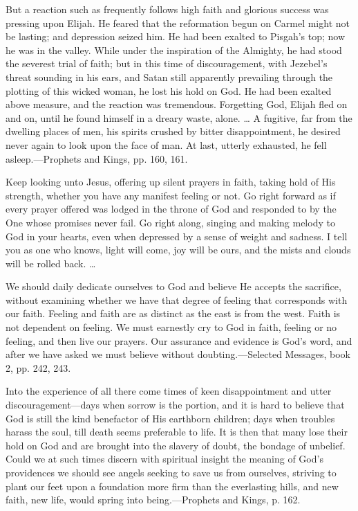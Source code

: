 \documentclass[a4paper, 10pt, twoside, headings=small]{scrartcl}
\begin{document}
\begin{multicols}{2}
But a reaction such as frequently follows high faith and glorious success was pressing upon Elijah. He feared that the reformation begun on Carmel might not be lasting; and depression seized him. He had been exalted to Pisgah’s top; now he was in the valley. While under the inspiration of the Almighty, he had stood the severest trial of faith; but in this time of discouragement, with Jezebel’s threat sounding in his ears, and Satan still apparently prevailing through the plotting of this wicked woman, he lost his hold on God. He had been exalted above measure, and the reaction was tremendous. Forgetting God, Elijah fled on and on, until he found himself in a dreary waste, alone. … A fugitive, far from the dwelling places of men, his spirits crushed by bitter disappointment, he desired never again to look upon the face of man. At last, utterly exhausted, he fell asleep.—Prophets and Kings, pp. 160, 161.

Keep looking unto Jesus, offering up silent prayers in faith, taking hold of His strength, whether you have any manifest feeling or not. Go right forward as if every prayer offered was lodged in the throne of God and responded to by the One whose promises never fail. Go right along, singing and making melody to God in your hearts, even when depressed by a sense of weight and sadness. I tell you as one who knows, light will come, joy will be ours, and the mists and clouds will be rolled back. …

We should daily dedicate ourselves to God and believe He accepts the sacrifice, without examining whether we have that degree of feeling that corresponds with our faith. Feeling and faith are as distinct as the east is from the west. Faith is not dependent on feeling. We must earnestly cry to God in faith, feeling or no feeling, and then live our prayers. Our assurance and evidence is God’s word, and after we have asked we must believe without doubting.—Selected Messages, book 2, pp. 242, 243.

Into the experience of all there come times of keen disappointment and utter discouragement—days when sorrow is the portion, and it is hard to believe that God is still the kind benefactor of His earthborn children; days when troubles harass the soul, till death seems preferable to life. It is then that many lose their hold on God and are brought into the slavery of doubt, the bondage of unbelief. Could we at such times discern with spiritual insight the meaning of God’s providences we should see angels seeking to save us from ourselves, striving to plant our feet upon a foundation more firm than the everlasting hills, and new faith, new life, would spring into being.—Prophets and Kings, p. 162.


\end{multicols}
\end{document}
